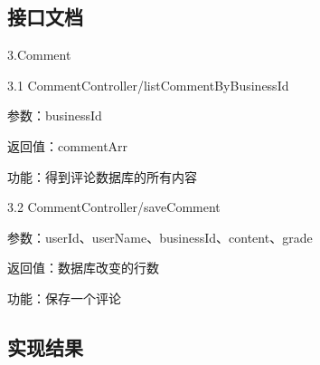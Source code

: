 \subsection{接口文档}
3.Comment

3.1 CommentController/listCommentByBusinessId

参数：businessId

返回值：commentArr

功能：得到评论数据库的所有内容

3.2 CommentController/saveComment

参数：userId、userName、businessId、content、grade

返回值：数据库改变的行数

功能：保存一个评论~\\

\subsection{实现结果}
